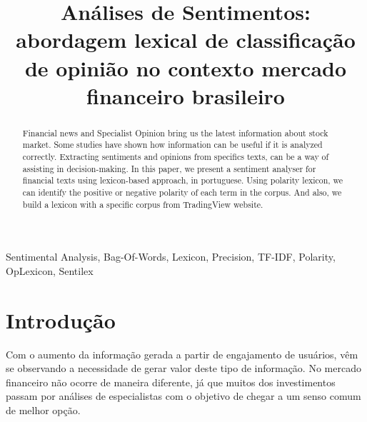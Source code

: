 \documentclass[conference]{IEEEtran}
\begin{document}
\title{\LARGE Análises de Sentimentos: abordagem lexical de classificação de opinião no contexto mercado financeiro brasileiro}


 \author{
 }

\maketitle

\begin{abstract}
Financial news and Specialist Opinion bring us the latest information about stock market. Some studies have shown how information can be useful if it is analyzed correctly. Extracting sentiments and opinions from specifics texts, can be a way of assisting in decision-making. In this paper, we present a sentiment analyser for financial texts using lexicon-based approach, in portuguese. Using polarity lexicon, we can identify the positive or negative polarity of each term in the corpus. And also, we build a lexicon with a specific corpus from TradingView website.
\end{abstract}

\IEEEoverridecommandlockouts
\begin{keywords}
Sentimental Analysis, Bag-Of-Words, Lexicon, Precision, TF-IDF, Polarity, OpLexicon, Sentilex
\end{keywords}

\IEEEpeerreviewmaketitle



\section{Introdução}

Com o aumento da informação gerada a partir de engajamento de usuários, vêm se observando a necessidade de gerar valor deste tipo de informação. No mercado financeiro não ocorre de maneira diferente, já que muitos dos investimentos passam por análises de especialistas com o objetivo de chegar a um senso comum de melhor opção. 
\end{document}
